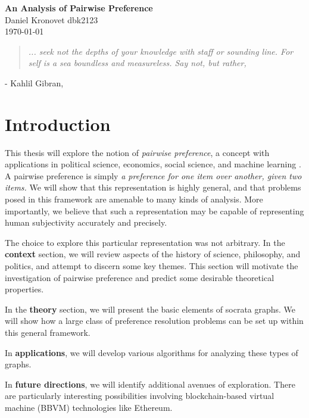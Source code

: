 \documentclass[12pt]{book}
\begin{document}
\begin{center}
  \Large \textbf{An Analysis of Pairwise Preference} \\
  \vspace{0.1in}
  \normalsize Daniel Kronovet dbk2123\\
  \today
\end{center}
  
  
\begin{quotation}
\textit{
	... seek not the depths of your knowledge with staff or sounding line.
	For self is a sea boundless and measureless.
	Say not,  but rather, 
	}
\end{quotation}
\begin{center}
- Kahlil Gibran, \textit{} 
\end{center}

  
\section{Introduction}

This thesis will explore the notion of \textit{pairwise preference}, a concept with applications in political science, economics, social science, and machine learning \cite{jordan} \cite{arrow}.
A pairwise preference is simply \textit{a preference for one item over another, given two items.}
We will show that this representation is highly general, and that problems posed in this framework are amenable to many kinds of analysis.
More importantly, we believe that such a representation may be capable of representing human subjectivity accurately and precisely.

\bigskip

The choice to explore this particular representation was not arbitrary.
In the \textbf{context} section, we will review aspects of the history of science, philosophy, and politics, and attempt to discern some key themes.
This section will motivate the investigation of pairwise preference and predict some desirable theoretical properties.

In the \textbf{theory} section, we will present the basic elements of socrata graphs.
We will show how a large class of preference resolution problems can be set up within this general framework.

In \textbf{applications}, we will develop various algorithms for analyzing these types of graphs.

In \textbf{future directions}, we will identify additional avenues of exploration. There are particularly interesting possibilities involving blockchain-based virtual machine (BBVM) technologies like Ethereum.
\end{document}
